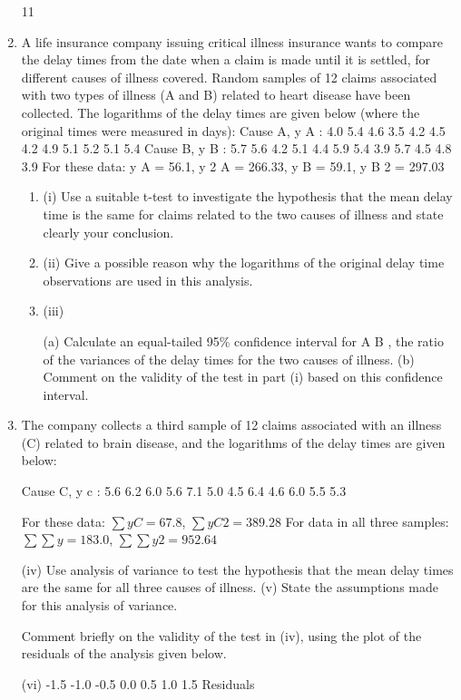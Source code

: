 \documentclass[a4paper,12pt]{article}
\begin{document}
\begin{enumerate}
11
\item A life insurance company issuing critical illness insurance wants to compare the delay times from the date when a claim is made until it is settled, for different causes of
illness covered. Random samples of 12 claims associated with two types of illness (A and B) related to heart disease have been collected. The logarithms of the delay times
are given below (where the original times were measured in days):
Cause A, y A : 4.0 5.4 4.6 3.5 4.2 4.5 4.2 4.9 5.1 5.2 5.1 5.4
Cause B, y B : 5.7 5.6 4.2 5.1 4.4 5.9 5.4 3.9 5.7 4.5 4.8 3.9
For these data:
\sum y A = 56.1, \sum y 2 A = 266.33,
\sum y B = 59.1, \sum y B 2 = 297.03
\begin{enumerate}
\item 
(i) Use a suitable t-test to investigate the hypothesis that the mean delay time is the same for claims related to the two causes of illness and state clearly your
conclusion.
\item 
(ii) Give a possible reason why the logarithms of the original delay time observations are used in this analysis.
\item (iii)

(a) Calculate an equal-tailed 95\% confidence interval for  A  B , the
ratio of the variances of the delay times for the two causes of illness.
(b) Comment on the validity of the test in part (i) based on this confidence
interval.
\end{enumerate}


\item The company collects a third sample of 12 claims associated with an illness (C) related to brain disease, and the logarithms of the delay times are given below:

Cause C, y c : 5.6 6.2 6.0 5.6 7.1 5.0 4.5 6.4 4.6 6.0 5.5 5.3

For these data:
$\sum y C = 67.8$, $\sum y C 2 = 389.28$
For data in all three samples:
$\sum\sum y = 183.0$, $\sum\sum y 2 = 952.64$

(iv) Use analysis of variance to test the hypothesis that the mean delay times are the same for all three causes of illness.
(v) State the assumptions made for this analysis of variance.

Comment briefly on the validity of the test in (iv), using the plot of the
residuals of the analysis given below.

(vi)
-1.5
-1.0
-0.5
0.0
0.5
1.0
1.5
Residuals
\end{enumerate}
\end{document}
